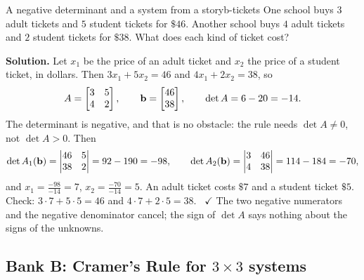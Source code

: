 \documentclass[11pt]{article}
\begin{document}
\begin{exmp}{A negative determinant and a system from a story}{b-tickets}
One school buys $3$ adult tickets and $5$ student tickets for $\$46$. Another school buys $4$ adult tickets and $2$ student tickets for $\$38$. What does each kind of ticket cost?

\textbf{Solution.} Let $x_1$ be the price of an adult ticket and $x_2$ the price of a student ticket, in dollars. Then $3x_1+5x_2=46$ and $4x_1+2x_2=38$, so
\[
A=\begin{bmatrix}3&5\\4&2\end{bmatrix},\qquad\mathbf{b}=\begin{bmatrix}46\\38\end{bmatrix},\qquad\det A=6-20=-14.
\]
The determinant is negative, and that is no obstacle: the rule needs $\det A\neq0$, not $\det A>0$. Then
\[
\det A_1(\mathbf{b})=\begin{vmatrix}46&5\\38&2\end{vmatrix}=92-190=-98,\qquad
\det A_2(\mathbf{b})=\begin{vmatrix}3&46\\4&38\end{vmatrix}=114-184=-70,
\]
and $x_1=\frac{-98}{-14}=7$, $x_2=\frac{-70}{-14}=5$. An adult ticket costs $\$7$ and a student ticket $\$5$. Check: $3\cdot7+5\cdot5=46$ and $4\cdot7+2\cdot5=38$. \ $\checkmark$ The two negative numerators and the negative denominator cancel; the sign of $\det A$ says nothing about the signs of the unknowns.
\end{exmp}

\subsection*{Bank B: Cramer's Rule for $3\times3$ systems}
\end{document}
